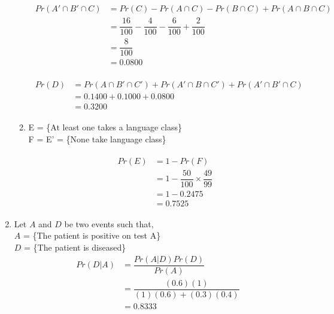 \documentclass{article}
\begin{document}
\begin{enumerate}
\begin{enumerate}
			\begin{align*}
			\begin{split}
			Pr(A' \cap B' \cap C) &= Pr(C) - Pr(A \cap C) - Pr(B \cap C) + Pr(A \cap B \cap C)\\ &= \dfrac{16}{100} - \dfrac{4}{100} - \dfrac{6}{100} + \dfrac{2}{100}\\ &= \dfrac{8}{100}\\ &= 0.0800
			\end{split}
			\end{align*}
			
			\begin{align*}
				\begin{split}
					Pr(D) &= Pr(A \cap B' \cap C') + Pr(A' \cap B \cap C') + Pr(A' \cap B' \cap C)\\ &= 0.1400 + 0.1000 + 0.0800\\ &= \mathbf{0.3200}
				\end{split}
			\end{align*}
			\item 
			
			E = \{At least one takes a language class\}\\
			F = E' = \{None take language class\}
			
			\begin{align*}
				\begin{split}
					Pr(E) &= 1 - Pr(F)\\
						  &= 1 - \dfrac{50}{100} \times \dfrac{49}{99}\\
						  &= 1 - 0.2475\\
						  &= \mathbf{0.7525}
				\end{split}
			\end{align*}
			
		\end{enumerate}	
		
		\newpage
		
		\item \large
		Let $A$ and $D$ be two events such that, \\
		 
		$A$ = \{The patient is positive on test A\}\\
		$D$ = \{The patient is diseased\}\\
		
		\begin{align*}
			Pr(D|A) &= \dfrac{Pr(A|D) Pr(D)}{Pr(A)}\\
					&= \dfrac{(0.6)(1)}{(1)(0.6) + (0.3)(0.4)}\\
					&= \mathbf{0.8333}
		\end{align*}
		

\end{enumerate}
\end{document}
